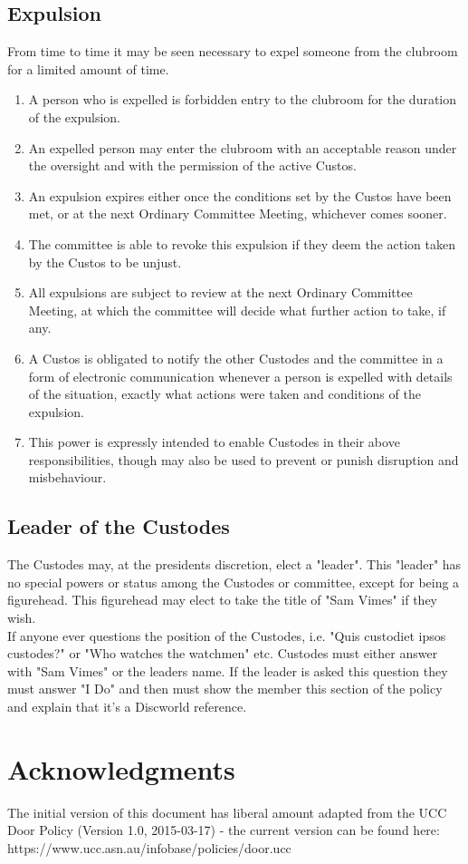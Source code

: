 \documentclass[10pt,a4paper]{report}
\begin{document}
		\section{Expulsion}
		From time to time it may be seen necessary to expel someone from the clubroom for a limited amount of time.
		\begin{enumerate}
			\item A person who is expelled is forbidden entry to the clubroom for the duration of the expulsion.
			\item An expelled person may enter the clubroom with an acceptable reason under the oversight and with the permission of the active Custos.
			\item An expulsion expires either once the conditions set by the Custos have been met, or at the next Ordinary Committee Meeting, whichever comes sooner.
			\item The committee is able to revoke this expulsion if they deem the action taken by the Custos to be unjust.
			\item All expulsions are subject to review at the next Ordinary Committee Meeting, at which the committee will decide what further action to take, if any.
			\item A Custos is obligated to notify the other Custodes and the committee in a form of electronic communication whenever a person is expelled with details of the situation, exactly what actions were taken and conditions of the expulsion.
			\item This power is expressly intended to enable Custodes in their above responsibilities, though may also be used to prevent or punish disruption and misbehaviour.
		\end{enumerate}
		
		\section{Leader of the Custodes}
		The Custodes may, at the presidents discretion, elect a "leader". This "leader" has no special powers or status among the Custodes or committee, except for being a figurehead. This figurehead may elect to take the title of "Sam Vimes" if they wish.\\
		If anyone ever questions the position of the Custodes, i.e. "Quis custodiet ipsos custodes?" or "Who watches the watchmen" etc. Custodes must either answer with "Sam Vimes" or the leaders name. If the leader is asked this question they must answer "I Do" and then must show the member this section of the policy and explain that it's a Discworld reference.
		
	\chapter{Acknowledgments}
		The initial version of this document has liberal amount adapted from the UCC Door Policy (Version 1.0, 2015-03-17)  - the current version can be found here: https://www.ucc.asn.au/infobase/policies/door.ucc
\end{document}
